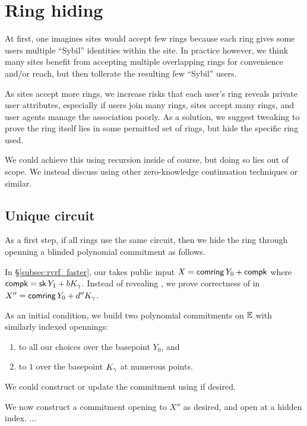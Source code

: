 \section{Ring hiding}%
\label{sec:ring_hiding}

At first, one imagines sites would accept few rings because each ring
gives some users multiple ``Sybil'' identities within the site.
In practice however, we think many sites benefit from accepting
multiple overlapping rings for convenience and/or reach, but then
tollerate the resulting few ``Sybil'' users.

As sites accept more rings, we increase risks that each user's ring
\ctx reveals private user attributes, especially if
 users join many rings, sites accept many rings, and
 user agents manage the association poorly.
As a solution, we suggest tweaking \pifast to prove the ring itself
lies in some permitted set of rings, but hide the specific ring used.

We could achieve this using recursion inside \pifast of course,
but doing so lies out of scope.  We instead discuss using other
zero-knowledge continuation techniques or similar.

\subsection{Unique circuit}

As a first step, if all rings use the same circuit, then we hide the
ring through openning a blinded polynomial commitment \cite{KZG} as follows. 

In \S\ref{subsec:rvrf_faster}, our \pifast takes public input
 $X = \mathsf{comring}\, Y_0 + \mathsf{compk}$ where $\mathsf{compk} = \mathsf{sk}\, Y_1 + b K_\gamma$.
Instead of revealing \comring, we prove correctness of \comring in
 $X'' = \mathsf{comring}\, Y_0 + d'' K_\gamma$.

As an initial condition, we build two polynomial commitments \cite{KZG}
on ${\mathbb{E}}$ with similarly indexed opennings:
\begin{enumerate}
\item to all our \comring choices over the basepoint $Y_0$, and
\item to $1$ over the basepoint $K_\gamma$ at numerous points.
\end{enumerate}
We could construct or update the \comring commitment using \cite{aSVC} if desired.

We now construct a commitment opening to $X''$ as desired, and
open at a hidden index. ...

